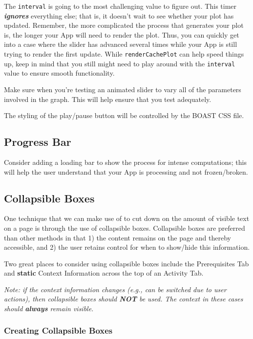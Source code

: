 \documentclass[
]{book}
\begin{document}
The \texttt{interval} is going to the most challenging value to figure out. This timer \emph{\textbf{ignores}} everything else; that is, it doesn't wait to see whether your plot has updated. Remember, the more complicated the process that generates your plot is, the longer your App will need to render the plot. Thus, you can quickly get into a case where the slider has advanced several times while your App is still trying to render the first update. While \texttt{renderCachePlot} can help speed things up, keep in mind that you still might need to play around with the \texttt{interval} value to ensure smooth functionality.

Make sure when you're testing an animated slider to vary all of the parameters involved in the graph. This will help ensure that you test adequately.

The styling of the play/pause button will be controlled by the BOAST CSS file.

\hypertarget{progress-bar-1}{%
\subsection{Progress Bar}\label{progress-bar-1}}

Consider adding a loading bar to show the process for intense computations; this will help the user understand that your App is processing and not frozen/broken.

\hypertarget{collapsibleb}{%
\subsection{Collapsible Boxes}\label{collapsibleb}}

One technique that we can make use of to cut down on the amount of visible text on a page is through the use of collapsible boxes. Collapsible boxes are preferred than other methods in that 1) the content remains on the page and thereby accessible, and 2) the user retains control for when to show/hide this information.

Two great places to consider using collapsible boxes include the Prerequisites Tab and \textbf{static} Context Information across the top of an Activity Tab.

\emph{Note: if the context information changes (e.g., can be switched due to user actions), then collapsible boxes should \textbf{NOT} be used. The context in these cases should \textbf{always} remain visible.}

\hypertarget{creating-collapsible-boxes-1}{%
\subsubsection{Creating Collapsible Boxes}\label{creating-collapsible-boxes-1}}
\end{document}
